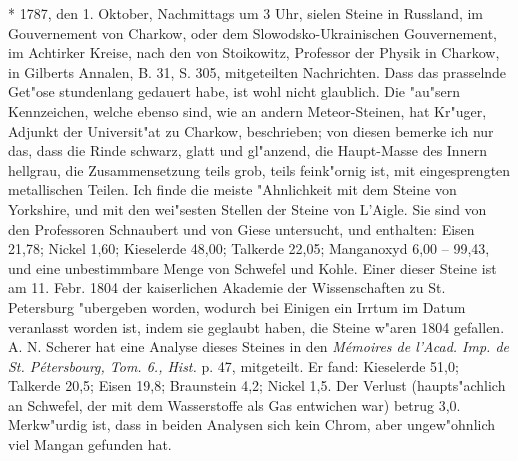 \documentclass[a4paper, 11pt, oneside, polutonikogreek, german]{article}
\begin{document}
* 1787, den 1. Oktober, Nachmittags um 3 Uhr, sielen Steine in Russland, im Gouvernement von Charkow, oder dem Slowodsko-Ukrainischen Gouvernement, im Achtirker Kreise, nach den von Stoikowitz, Professor der Physik in Charkow, in Gilberts Annalen, B. 31, S. 305, mitgeteilten Nachrichten. Dass das prasselnde Get"ose stundenlang gedauert habe, ist wohl nicht glaublich. Die "au"sern Kennzeichen, welche ebenso sind, wie an andern Meteor-Steinen, hat Kr"uger, Adjunkt der Universit"at zu Charkow, beschrieben; von diesen bemerke ich nur das, dass die Rinde schwarz, glatt und gl"anzend, die Haupt-Masse des Innern hellgrau, die Zusammensetzung teils grob, teils feink"ornig ist, mit eingesprengten metallischen Teilen. Ich finde die meiste "Ahnlichkeit mit dem Steine von Yorkshire, und mit den wei"sesten Stellen der Steine von L'Aigle. Sie sind von den Professoren Schnaubert und von Giese untersucht, und enthalten: Eisen 21,78; Nickel 1,60; Kieselerde 48,00; Talkerde 22,05; Manganoxyd 6,00 -- 99,43, und eine unbestimmbare Menge von Schwefel und Kohle. Einer dieser Steine ist am 11. Febr. 1804 der kaiserlichen Akademie der Wissenschaften zu St. Petersburg "ubergeben worden, wodurch bei Einigen ein Irrtum im Datum veranlasst worden ist, indem sie geglaubt haben, die Steine w"aren 1804 gefallen. A. N. Scherer hat eine Analyse dieses Steines in den \emph{Mémoires de l'Acad. Imp. de St. Pétersbourg, Tom. 6., Hist.} p. 47, mitgeteilt. Er fand: Kieselerde 51,0; Talkerde 20,5; Eisen 19,8; Braunstein 4,2; Nickel 1,5. Der Verlust (haupts"achlich an Schwefel, der mit dem Wasserstoffe als Gas entwichen war) betrug 3,0. Merkw"urdig ist, dass in beiden Analysen sich kein Chrom, aber ungew"ohnlich viel Mangan gefunden hat.
\end{document}
